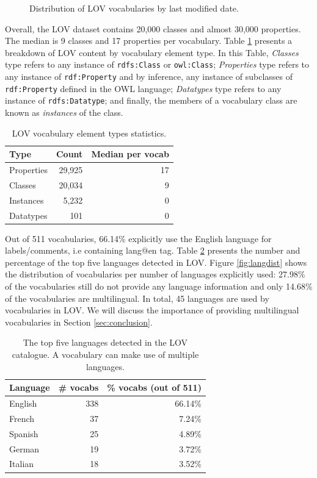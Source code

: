 \documentclass{iosart2c}
\begin{document}
\begin{figure}[htb]
\resizebox{\linewidth}{!}{}
\caption{\label{fig:modifevol} Distribution of LOV vocabularies by last modified date.}
\end{figure}

 
Overall, the LOV dataset contains 20,000 classes and almost 30,000 properties. The median is 9 classes and 17 properties per vocabulary. Table \ref{tab:elements} presents a breakdown of LOV content by vocabulary element type. In this Table, \emph{Classes} type refers to any instance of {\small\texttt{rdfs:Class}} or {\small\texttt{owl:Class}}; \emph{Properties} type refers to any instance of {\small\texttt{rdf:Property}} and by inference, any instance of subclasses of {\small\texttt{rdf:Property}} defined in the OWL language; \emph{Datatypes} type refers to any instance of {\small\texttt{rdfs:Datatype}}; and finally, the members of a vocabulary class are known as \emph{instances} of the class.

\begin{table}[htb]
\caption{LOV vocabulary element types statistics.}
\begin{tabular}{lrr}
\hline
\textbf{Type} & \textbf{Count} &  \textbf{Median per vocab} \\ \hline
Properties & 29,925 & 17 \\
Classes & 20,034 & 9 \\
Instances & 5,232 & 0 \\
Datatypes & 101 & 0 \\
\hline  
\end{tabular}
\label{tab:elements}
\end{table}

Out of 511 vocabularies, 66.14\% explicitly use the English language for labels/comments, i.e containing lang@en tag. Table \ref{tab:language} presents the number and percentage of the top five languages detected in LOV. Figure \ref{fig:langdist} shows the distribution of vocabularies per number of languages explicitly 
used: 27.98\% of the vocabularies still do not provide any language information and only 14.68\% of the vocabularies are multilingual. In total, 45 languages are used by vocabularies in LOV. We will discuss the importance of providing multilingual vocabularies in Section \ref{sec:conclusion}.

 \begin{table}[h!tb]
\caption{The top five languages detected in the LOV catalogue. A vocabulary can make use of multiple languages.}
\begin{tabular}{lrr}
\hline
\textbf{Language} & \textbf{\# vocabs} & \textbf{\% vocabs (out of 511)}  \\ \hline
English & 338 & 66.14\%      \\
French & 37 & 7.24\%      \\
Spanish & 25 & 4.89\%      \\
German & 19 & 3.72\%      \\
Italian & 18 & 3.52\%      \\
\hline  
\end{tabular}
\label{tab:language}
\end{table}
\end{document}
